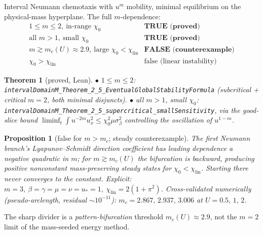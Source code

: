\documentclass[11pt]{article}
\newtheorem{theorem}{Theorem}
\newtheorem{proposition}{Proposition}
\begin{document}
Interval Neumann chemotaxis with $u^m$ mobility, minimal equilibrium on the physical-mass
hyperplane. The full $m$-dependence:
\[
\begin{array}{ll}
1\le m\le 2,\ \text{in-range }\chi_0 & \textbf{TRUE (proved)}\\
\text{all } m>1,\ \text{small }\chi_0 & \textbf{TRUE (proved)}\\
m\gtrsim m_c(U)\approx2.9,\ \text{large }\chi_0<\chi_{\mathrm{lin}} & \textbf{FALSE (counterexample)}\\
\chi_0>\chi_{\mathrm{lin}} & \text{false (linear instability)}
\end{array}
\]
\begin{theorem}[proved, Lean]
$\bullet$ $1\le m\le2$: \texttt{intervalDomainM\_Theorem\_2\_5\_EventualGlobalStabilityFormula}
(subcritical + critical $m=2$, both minimal disjuncts).
$\bullet$ all $m>1$, small $\chi_0$:
\texttt{intervalDomainM\_Theorem\_2\_5\_supercritical\_smallSensitivity}, via the good-slice bound
$\liminf_t\int u^{-2m}u_x^2 \le \chi_0^2\mu\sigma_\beta^2$ controlling the oscillation of $u^{1-m}$.
\end{theorem}
\begin{proposition}[false for $m>m_c$; steady counterexample]
The first Neumann branch's Lyapunov--Schmidt direction coefficient has leading dependence a
negative quadratic in $m$; for $m\gtrsim m_c(U)$ the bifurcation is backward, producing positive
nonconstant mass-preserving steady states for $\chi_0<\chi_{\mathrm{lin}}$. Starting there never
converges to the constant. Explicit: $m=3,\ \beta=\gamma=\mu=\nu=u_*=1,\ \chi_{\mathrm{lin}}=2(1+\pi^2)$.
Cross-validated numerically (pseudo-arclength, residual $\sim10^{-11}$):
$m_c=2.867,\,2.937,\,3.006$ at $U=0.5,\,1,\,2$.
\end{proposition}
The sharp divider is a \emph{pattern-bifurcation} threshold $m_c(U)\approx2.9$, not the $m=2$
limit of the mass-seeded energy method.
\end{document}
